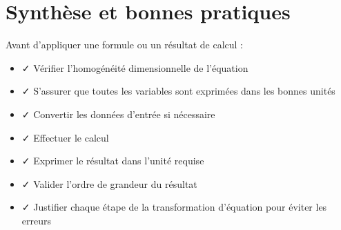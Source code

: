 \section{Synthèse et bonnes pratiques}

\begin{tcolorbox}[colback=FedBlue!10, colframe=FedBlue, coltitle=white, title=Checklist — Analyse dimensionnelle et conversions]
  Avant d'appliquer une formule ou un résultat de calcul :

  \begin{itemize}
    \item ✓ Vérifier l'homogénéité dimensionnelle de l'équation
    \item ✓ S'assurer que toutes les variables sont exprimées dans les bonnes unités
    \item ✓ Convertir les données d'entrée si nécessaire
    \item ✓ Effectuer le calcul
    \item ✓ Exprimer le résultat dans l'unité requise
    \item ✓ Valider l'ordre de grandeur du résultat
    \item ✓ Justifier chaque étape de la transformation d'équation pour éviter les erreurs
  \end{itemize}
\end{tcolorbox}

\finchapitre
